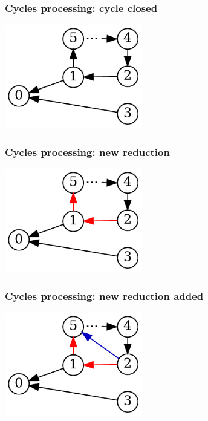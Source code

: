 \documentclass{beamer}
\begin{document}
\begin{frame}
  \transwipe[direction=90]
  \frametitle{Cycles processing: cycle closed}
  \begin{center}                                
  \includegraphics[width=6cm]{pictures/gss_cycle/gss_cycle_no_red_no_highlight}
  \end{center}
\end{frame}

\begin{frame}
  \transwipe[direction=90]
  \frametitle{Cycles processing: new reduction}
  \begin{center}                                
  \includegraphics[width=6cm]{pictures/gss_cycle/gss_cycle_no_red}
  \end{center}
\end{frame}

\begin{frame}
  \transwipe[direction=90]
  \frametitle{Cycles processing: new reduction added}
  \begin{center}                                
  \includegraphics[width=6cm]{pictures/gss_cycle/gss_cycle}
  \end{center}
\end{frame}
\end{document}
